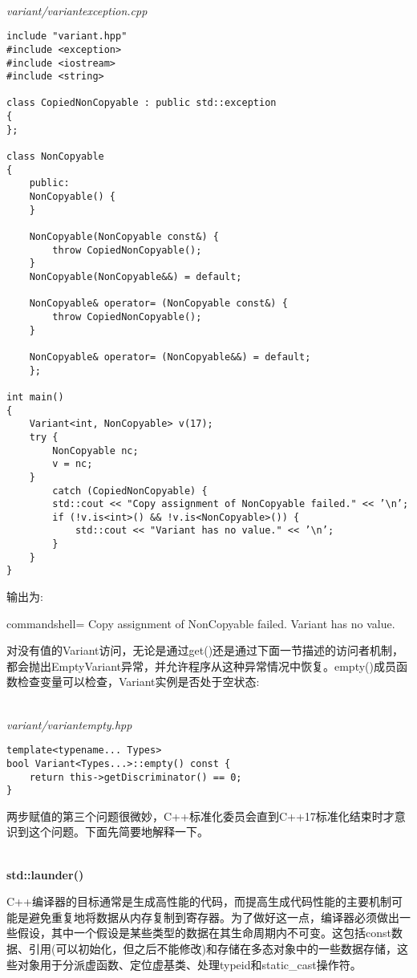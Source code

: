 \hspace*{\fill} \\ %
\noindent
\textit{variant/variantexception.cpp}
\begin{lstlisting}[style=styleCXX]
include "variant.hpp"
#include <exception>
#include <iostream>
#include <string>

class CopiedNonCopyable : public std::exception
{
};

class NonCopyable
{
	public:
	NonCopyable() {
	}

	NonCopyable(NonCopyable const&) {
		throw CopiedNonCopyable();
	}
	NonCopyable(NonCopyable&&) = default;
	
	NonCopyable& operator= (NonCopyable const&) {
		throw CopiedNonCopyable();
	}

	NonCopyable& operator= (NonCopyable&&) = default;
	};

int main()
{
	Variant<int, NonCopyable> v(17);
	try {
		NonCopyable nc;
		v = nc;
	}
		catch (CopiedNonCopyable) {
		std::cout << "Copy assignment of NonCopyable failed." << ’\n’;
		if (!v.is<int>() && !v.is<NonCopyable>()) {
			std::cout << "Variant has no value." << ’\n’;
		}
	}
}
\end{lstlisting}

输出为:

\begin{tcblisting}{commandshell={}}
Copy assignment of NonCopyable failed.
Variant has no value.
\end{tcblisting}

对没有值的Variant访问，无论是通过get()还是通过下面一节描述的访问者机制，都会抛出EmptyVariant异常，并允许程序从这种异常情况中恢复。empty()成员函数检查变量可以检查，Variant实例是否处于空状态:

\hspace*{\fill} \\ %
\noindent
\textit{variant/variantempty.hpp}
\begin{lstlisting}[style=styleCXX]
template<typename... Types>
bool Variant<Types...>::empty() const {
	return this->getDiscriminator() == 0;
}
\end{lstlisting}

两步赋值的第三个问题很微妙，C++标准化委员会直到C++17标准化结束时才意识到这个问题。下面先简要地解释一下。

\hspace*{\fill} \\ %
\noindent
\textbf{std::launder()}

C++编译器的目标通常是生成高性能的代码，而提高生成代码性能的主要机制可能是避免重复地将数据从内存复制到寄存器。为了做好这一点，编译器必须做出一些假设，其中一个假设是某些类型的数据在其生命周期内不可变。这包括const数据、引用(可以初始化，但之后不能修改)和存储在多态对象中的一些数据存储，这些对象用于分派虚函数、定位虚基类、处理typeid和static\_cast操作符。

